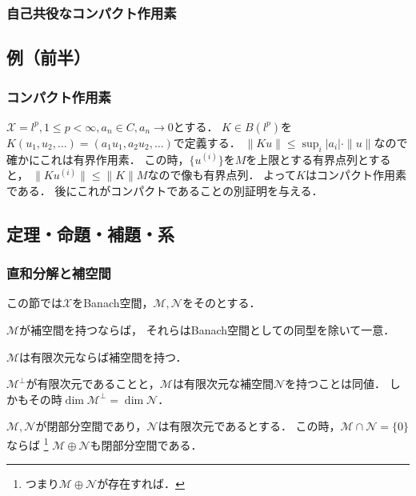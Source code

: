\documentclass[a4j]{jsarticle}
\newcommand{\spX}{\mathscr{X}}
\newcommand{\spM}{\mathscr{M}}
\newcommand{\spN}{\mathscr{N}}
\begin{document}
    \subsubsection{自己共役なコンパクト作用素}

    \subsection{例（前半）}
    \subsubsection{コンパクト作用素}
    \begin{Example}[問, p.258]
        $\spX=l^p, 1 \leq p<\infty, a_n \in C, a_n \to 0$とする．
        $K \in B(l^p)$を$K(u_1,u_2,\dots)=(a_1u_1,a_2u_2,\dots)$で定義する．
        $\|Ku\| \leq \sup_i|a_i| \cdot \|u\|$なので確かにこれは有界作用素．
        この時，$\{u^{(i)}\}$を$M$を上限とする有界点列とすると，
        $\|K u^{(i)}\| \leq \|K\|M$なので像も有界点列．
        よって$K$はコンパクト作用素である．
        後にこれがコンパクトであることの別証明を与える．
    \end{Example}

    \newpage
    \subsection{定理・命題・補題・系}
    \subsubsection{直和分解と補空間}
    この節では$\spX$をBanach空間，$\spM,\spN$をそのとする．
    \begin{Them}[定理11.2, p.252] \label{them1102}
        $\spM$が補空間を持つならば，
        それらはBanach空間としての同型を除いて一意．
    \end{Them}
    \begin{Them}[定理11.3, p.253] \label{them1103}
        $\spM$は有限次元ならば補空間を持つ．
    \end{Them}
    \begin{Them}[定理11.4, p.253] \label{them1104}
        $\spM^{\perp}$が有限次元であることと，$\spM$は有限次元な補空間$\spN$を持つことは同値．
        しかもその時$\dim \spM^{\perp}=\dim \spN$．
    \end{Them}
    \begin{Them}[定理11.7, p.255] \label{them1107}
        $\spM,\spN$が閉部分空間であり，$\spN$は有限次元であるとする．
        この時，$\spM \cap \spN=\{0\}$ならば
        \footnote{つまり$\spM \oplus \spN$が存在すれば．}
        $\spM \oplus \spN$も閉部分空間である．
    \end{Them}
\end{document}
